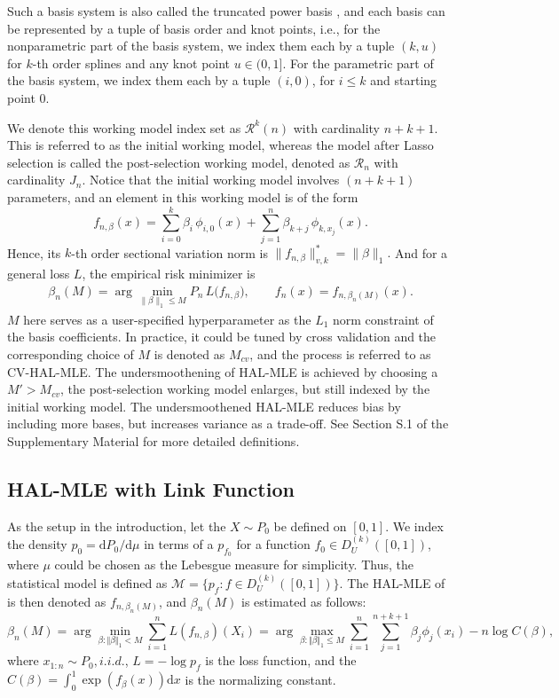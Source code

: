 \begin{remark}
Such a basis system is also called the truncated power basis \citep[Theorem 8.51]{schumaker2007spline}, and each basis can be represented by a tuple of basis order and knot points, i.e., for the nonparametric part of the basis system, we index them each by a tuple $(k, u)$ for $k$-th order splines and any knot point $u \in (0,1]$. For the parametric part of the basis system, we index them each by a tuple $(i, 0)$, for $i \leq k$ and starting point 0.
\end{remark}

We denote this working model index set as $\mathcal{R}^k(n)$ with cardinality $n+k+1$. This is referred to as the initial working model, whereas the model after Lasso selection is called the post-selection working model, denoted as $\mathcal{R}_n$ with cardinality $J_n$. Notice that the initial working model involves $(n+k+1)$ parameters, and an element in this working model is of the form
\[
  f_{n,\beta}(x)
  = \sum_{i=0}^k \beta_i\,\phi_{i,0}(x)
    + \sum_{j=1}^n \beta_{k+j}\,\phi_{k,x_j}(x).
\]
Hence, its $k$-th order sectional variation norm is
$\bigl\|f_{n,\beta}\bigr\|_{v,k}^* = \|\beta\|_1.$ And for a general loss \(L\), the empirical risk minimizer is
\begin{align} \label{equation: HAL beta optimizer}
 \beta_n(M)
  = \arg\min_{\|\beta\|_1 \le M}
    P_n\,L\bigl(f_{n,\beta}\bigr),
  \qquad
  f_n(x)=f_{n,\beta_n(M)}(x).   
\end{align}
$M$ here serves as a user-specified hyperparameter as the $L_1$ norm constraint of the basis coefficients. In practice, it could be tuned by cross validation and the corresponding choice of $M$ is denoted as $M_{cv}$, and the process is referred to as CV-HAL-MLE. The undersmoothening of HAL-MLE is achieved by choosing a $M' > M_{cv}$, the post-selection working model enlarges, but still indexed by the initial working model. The undersmoothened HAL-MLE reduces bias by including more bases, but increases variance as a trade-off. See Section S.1 of the Supplementary Material \citep{hou2026supplement} for more detailed definitions.

\subsection{HAL-MLE with Link Function} \label{HAl_MLE with Link Function}

As the setup in the introduction, let the $X\sim P_0$ be defined on $[0,1]$. We index the density $p_0 = \mathrm{d}P_0/\mathrm{d}\mu$ in terms of a $p_{f_0}$ for a function $f_0 \in D^{(k)}_U([0,1])$, where $\mu$ could be chosen as the Lebesgue measure for simplicity. Thus, the statistical model is defined as $\mathcal{M} = \{ p_{f} : f \in D^{(k)}_U([0,1]) \}$. The HAL-MLE of is then denoted as $f_{n, \beta_n(M)}$, and $\beta_n(M)$ is estimated as follows:
\[
\beta_n(M) = \arg \min_{\beta: \Vert \beta\Vert_1 < M} \sum_{i=1}^{n} L(f_{n, \beta})(X_i) = \arg \max_{\beta:  \Vert \beta\Vert_1 \leq M} \sum_{i=1}^{n} \sum_{j=1}^{n+k+1} \beta_j \phi_j(x_i) - n\log C(\beta),
\] where \( x_{1:n} \sim  P_0,  i.i.d.\), $L = -\log p_f$ is the loss function, and the $C(\beta) = \int_0^1 \exp(f_{\beta}(x)) \mathrm{d}x$ is the normalizing constant. 

